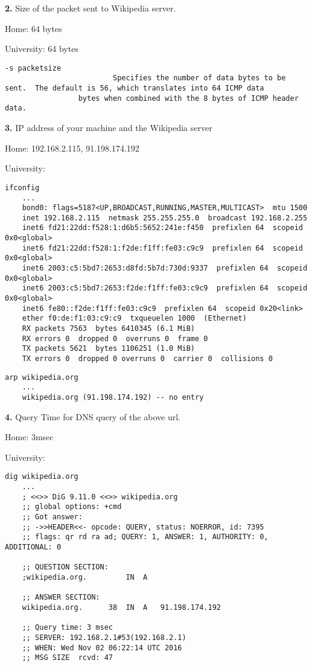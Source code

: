 \documentclass[12pt]{article}
\begin{document}
\textbf{2.} Size of the packet sent to Wikipedia server.

Home: 64 bytes

University: 64 bytes

\begin{lstlisting}[caption=man ping]
	       -s packetsize
	                     Specifies the number of data bytes to be sent.  The default is 56, which translates into 64 ICMP data
			     bytes when combined with the 8 bytes of ICMP header data.
\end{lstlisting}

\textbf{3.} IP address of your machine and the Wikipedia server

Home: 192.168.2.115, 91.198.174.192

University:

\begin{lstlisting}[caption=ifconfig home]
	ifconfig
	...
	bond0: flags=5187<UP,BROADCAST,RUNNING,MASTER,MULTICAST>  mtu 1500
	inet 192.168.2.115  netmask 255.255.255.0  broadcast 192.168.2.255
	inet6 fd21:22dd:f528:1:d6b5:5652:241e:f450  prefixlen 64  scopeid 0x0<global>
	inet6 fd21:22dd:f528:1:f2de:f1ff:fe03:c9c9  prefixlen 64  scopeid 0x0<global>
	inet6 2003:c5:5bd7:2653:d8fd:5b7d:730d:9337  prefixlen 64  scopeid 0x0<global>
	inet6 2003:c5:5bd7:2653:f2de:f1ff:fe03:c9c9  prefixlen 64  scopeid 0x0<global>
	inet6 fe80::f2de:f1ff:fe03:c9c9  prefixlen 64  scopeid 0x20<link>
	ether f0:de:f1:03:c9:c9  txqueuelen 1000  (Ethernet)
	RX packets 7563  bytes 6410345 (6.1 MiB)
	RX errors 0  dropped 0  overruns 0  frame 0
	TX packets 5621  bytes 1106251 (1.0 MiB)
	TX errors 0  dropped 0 overruns 0  carrier 0  collisions 0
\end{lstlisting}

\begin{lstlisting}[caption=arp wikipedia.org home]
	arp wikipedia.org
	...
	wikipedia.org (91.198.174.192) -- no entry	
\end{lstlisting}

\textbf{4.} Query Time for DNS query of the above url.

Home: 3msec

University: 

\begin{lstlisting}[caption=dig home]
	dig wikipedia.org
	...
	; <<>> DiG 9.11.0 <<>> wikipedia.org
	;; global options: +cmd
	;; Got answer:
	;; ->>HEADER<<- opcode: QUERY, status: NOERROR, id: 7395
	;; flags: qr rd ra ad; QUERY: 1, ANSWER: 1, AUTHORITY: 0, ADDITIONAL: 0

	;; QUESTION SECTION:
	;wikipedia.org.			IN	A

	;; ANSWER SECTION:
	wikipedia.org.		38	IN	A	91.198.174.192

	;; Query time: 3 msec
	;; SERVER: 192.168.2.1#53(192.168.2.1)
	;; WHEN: Wed Nov 02 06:22:14 UTC 2016
	;; MSG SIZE  rcvd: 47
\end{lstlisting}
\end{document}
